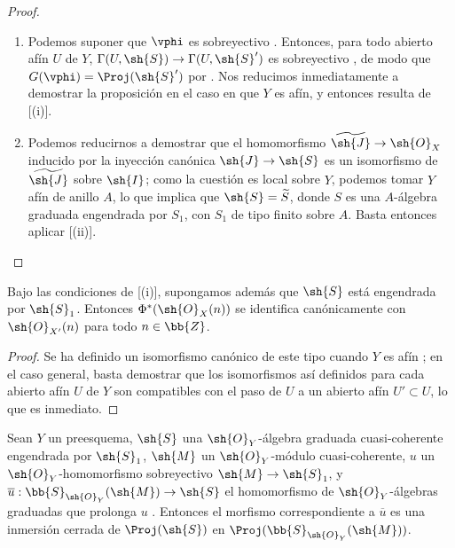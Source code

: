 \documentclass[oneside,10pt]{amsart}
\makeatletter
\newcommand{\ega@arrow}[2]{\mathchoice{#1}{#2}{#2}{#2}}
\renewcommand{\to}{\ega@arrow{\longrightarrow}{\rightarrow}}
\let\EGAOriginalLabel\label
\renewcommand{\label}[1]{\phantomsection\EGAOriginalLabel{#1}}
\makeatother
\begin{document}
\begin{proof}
\medskip\noindent
\begin{enumerate}
  \item[(i)] Podemos suponer que $\vphi$ es sobreyectivo .
    Entonces, para todo abierto afín $U$ de $Y$, $\Gamma(U,\sh{S})\to\Gamma(U,\sh{S}')$ es sobreyectivo , de modo que $G(\vphi)=\Proj(\sh{S}')$ por .
    Nos reducimos inmediatamente a demostrar la proposición en el caso en que $Y$ es afín, y entonces resulta de [(i)].
  \item[(ii)] Podemos reducirnos a demostrar que el homomorfismo $\widetilde{\sh{J}}\to\sh{O}_X$ inducido por la inyección canónica $\sh{J}\to\sh{S}$ es un isomorfismo de $\widetilde{\sh{J}}$ sobre $\sh{I}$; como la cuestión es local sobre $Y$, podemos tomar $Y$ afín de anillo $A$, lo que implica que $\sh{S}=\widetilde{S}$, donde $S$ es una $A$-álgebra graduada engendrada por $S_1$, con $S_1$ de tipo finito sobre $A$.
    Basta entonces aplicar [(ii)].
\end{enumerate}
\end{proof}

\begin{corollary}[3.6.3]
\label{II.3.6.3}
Bajo las condiciones de [(i)], supongamos además que $\sh{S}$ está engendrada por $\sh{S}_1$.
Entonces $\Phi^*(\sh{O}_X(n))$ se identifica canónicamente con $\sh{O}_{X'}(n)$ para todo $n\in\bb{Z}$.
\end{corollary}

\begin{proof}
Se ha definido un isomorfismo canónico de este tipo cuando $Y$ es afín ; en el caso general, basta demostrar que los isomorfismos así definidos para cada abierto afín $U$ de $Y$ son compatibles con el paso de $U$ a un abierto afín $U'\subset U$, lo que es inmediato.
\end{proof}

\begin{corollary}[3.6.4]
\label{II.3.6.4}
Sean $Y$ un preesquema, $\sh{S}$ una $\sh{O}_Y$-álgebra graduada cuasi-coherente engendrada por $\sh{S}_1$, $\sh{M}$ un $\sh{O}_Y$-módulo cuasi-coherente, $u$ un $\sh{O}_Y$-homomorfismo sobreyectivo $\sh{M}\to\sh{S}_1$, y $\overline{u}:\bb{S}_{\sh{O}_Y}(\sh{M})\to\sh{S}$ el homomorfismo de $\sh{O}_Y$-álgebras graduadas que prolonga $u$ .
Entonces el morfismo correspondiente a $\overline{u}$ es una inmersión cerrada de $\Proj(\sh{S})$ en $\Proj(\bb{S}_{\sh{O}_Y}(\sh{M}))$.
\end{corollary}
\end{document}
